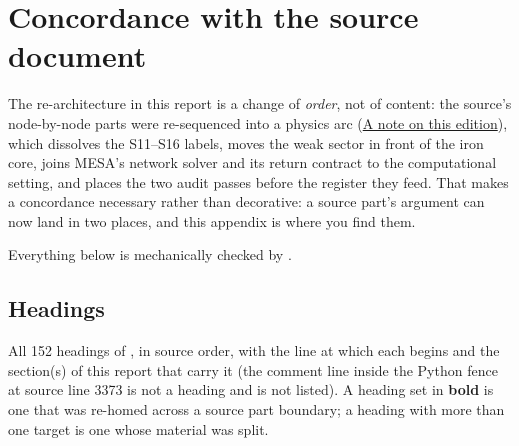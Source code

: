 %
%

\section{Concordance with the source document}
\label{app:concordance}

The re-architecture in this report is a change of \emph{order}, not of content:
the source's node-by-node parts were re-sequenced into a physics arc
(\hyperref[sec:edition]{A note on this edition}), which dissolves the S11--S16
labels, moves the weak sector in front of the iron core, joins MESA's network
solver and its return contract to the computational setting, and places the two
audit passes before the register they feed. That makes a concordance necessary
rather than decorative: a source part's argument can now land in two places, and
this appendix is where you find them.

Everything below is mechanically checked by
.

\subsection{Headings}
\label{app:headings}

All 152 headings of , in source order, with the line at
which each begins and the section(s) of this report that carry it (the
\code{\#} comment line inside the Python fence at source line 3373 is not a
heading and is not listed). A heading set in \textbf{bold} is one that was
re-homed across a source part boundary; a heading with more than one target is
one whose material was split.

